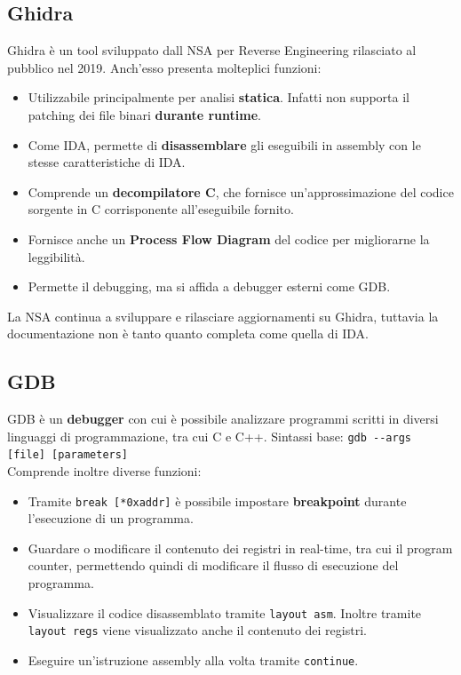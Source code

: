 \documentclass{article}
\begin{document}
\subsection{Ghidra}
Ghidra è un tool sviluppato dall NSA per Reverse Engineering rilasciato al pubblico nel 2019. Anch'esso presenta molteplici funzioni:
\begin{itemize}
	\item Utilizzabile principalmente per analisi \textbf{statica}. Infatti non supporta il patching dei file binari \textbf{durante runtime}.
	
	\item Come IDA, permette di \textbf{disassemblare} gli eseguibili in assembly con le stesse caratteristiche di IDA.
	
	\item Comprende un \textbf{decompilatore C}, che fornisce un'approssimazione del codice sorgente in C corrisponente all'eseguibile fornito.
	
	\item Fornisce anche un \textbf{Process Flow Diagram} del codice per migliorarne la leggibilità.
	
	\item Permette il debugging, ma si affida a debugger esterni come GDB.
\end{itemize}

La NSA continua a sviluppare e rilasciare aggiornamenti su Ghidra, tuttavia la documentazione non è tanto quanto completa come quella di IDA.

\newpage

\subsection{GDB}
GDB è un \textbf{debugger} con cui è possibile analizzare programmi scritti in diversi linguaggi di programmazione, tra cui C e C++.
Sintassi base: \verb|gdb --args [file] [parameters]|\\
Comprende inoltre diverse funzioni:
\begin{itemize}
	\item Tramite \verb|break [*0xaddr]| è possibile impostare \textbf{breakpoint} durante l'esecuzione di un programma.
	
	\item Guardare o modificare il contenuto dei registri in real-time, tra cui il program counter, permettendo quindi di modificare il flusso di esecuzione del programma.
	
	\item Visualizzare il codice disassemblato tramite \verb|layout asm|.
	Inoltre tramite \verb|layout regs| viene visualizzato anche il contenuto dei registri.
	
	\item Eseguire un’istruzione assembly alla volta tramite \verb|continue|.
\end{itemize}
\end{document}
